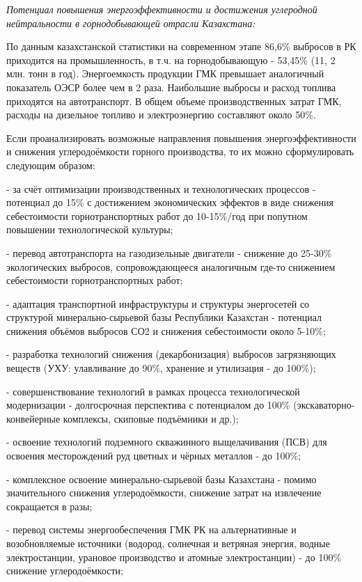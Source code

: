 \begin{multicols}{2}
\emph{Потенциал повышения энергоэффективности и достижения углеродной
нейтральности в горнодобывающей отрасли Казахстана:}

По данным казахстанской статистики на современном этапе 86,6\% выбросов
в РК приходится на промышленность, в т.ч. на горнодобывающую - 53,45\%
(11, 2 млн. тонн в год). Энергоемкость продукции ГМК превышает
аналогичный показатель ОЭСР более чем в 2 раза. Наибольшие выбросы и
расход топлива приходятся на автотранспорт. В общем объеме
производственных затрат ГМК, расходы на дизельное топливо и
электроэнергию составляют около 50\%.

Если проанализировать возможные направления повышения
энергоэффективности и снижения углеродоёмкости горного производства, то
их можно сформулировать следующим образом:

- за счёт оптимизации производственных и технологических процессов -
потенциал до 15\% с достижением экономических эффектов в виде снижения
себестоимости горнотранспортных работ до 10-15\%/год при попутном
повышении технологической культуры;

- перевод автотранспорта на газодизельные двигатели - снижение до
25-30\% экологических выбросов, сопровождающееся аналогичным где-то
снижением себестоимости горнотранспортных работ;

- адаптация транспортной инфраструктуры и структуры энергосетей со
структурой минерально-сырьевой базы Республики Казахстан - потенциал
снижения объёмов выбросов СО2 и снижения себестоимости около 5-10\%;

- разработка технологий снижения (декарбонизация) выбросов загрязняющих
веществ (УХУ: улавливание до 90\%, хранение и утилизация - до 100\%);

- совершенствование технологий в рамках процесса технологической
модернизации - долгосрочная перспектива с потенциалом до 100\%
(экскаваторно-конвейерные комплексы, скиповые подъёмники и др.);

- освоение технологий подземного скважинного выщелачивания (ПСВ) для
освоения месторождений руд цветных и чёрных металлов - до 100\%;

- комплексное освоение минерально-сырьевой базы Казахстана - помимо
значительного снижения углеродоёмкости, снижение затрат на извлечение
сокращается в разы;

- перевод системы энергообеспечения ГМК РК на альтернативные и
возобновляемые источники (водород, солнечная и ветряная энергия, водные
электростанции, урановое производство и атомные электростанции) - до
100\% снижение углеродоёмкости;


\end{multicols}
